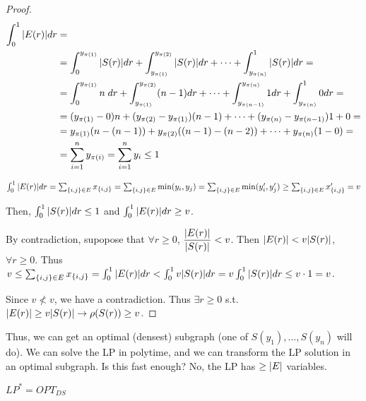 \begin{proof}
        \begin{equation*}
            \begin{split}
                \int_0^1 \vert E(r) \vert dr &=\\
                    &= \int_{0}^{y_{\pi(1)}} \vert S(r) \vert dr + \int_{y_{\pi(1)}}^{y_{\pi(2)}} \vert S(r) \vert dr + \cdots + \int_{y_{\pi(n)}}^{1} \vert S(r) \vert dr =\\
                    &= \int_{0}^{y_{\pi(1)}} n \; dr + \int_{y_{\pi(1)}}^{y_{\pi(2)}} (n-1)dr + \cdots + \int_{y_{\pi(n-1)}}^{y_{\pi(n)}} 1 dr + \int_{y_{\pi(n)}}^{1} 0 dr =\\
                    &= (y_{\pi(1)} - 0)n + (y_{\pi(2)} - y_{\pi(1)})(n-1) + \cdots + (y_{\pi(n)} - y_{\pi(n-1)})1 + 0 =\\
                    &= y_{\pi(1)} (n - (n-1)) + y_{\pi(2)}((n-1) - (n-2)) + \cdots + y_{\pi(n)}(1-0) =\\
                    &= \sum_{i=1}^{n} y_{\pi(i)} = \sum_{i=1}^{n} y_i \leq 1
            \end{split}
        \end{equation*}

        $  \int_0^1 \vert E(r) \vert dr = \sum_{\{i,j\} \in E} x_{\{i,j\}} = \sum_{\{i,j\} \in E} \min(y_i, y_j) = \sum_{\{i,j\} \in E} \min(y_i', y_j') \geq \sum_{\{i,j\} \in E} x_{\{i,j\}}' = v $

        Then, $\int_0^1 \vert S(r) \vert dr \leq 1$ and $\int_0^1 \vert E(r) \vert dr \geq v$.

        By contradiction, supopose that $\forall r \geq 0$, $\dfrac{\vert E(r) \vert}{\vert S(r) \vert} < v$.
        Then $\vert E(r) \vert < v \vert S(r) \vert$, $\forall r \geq 0$.
        Thus $v \leq \sum_{\{i,j\} \in E} x_{\{i,j\}} = \int_0^1 \vert E(r) \vert dr < \int_0^1 v \vert S(r) \vert dr = v \int_0^1 \vert S(r) \vert dr \leq v \cdot 1 = v$.

        Since $v \not< v$, we have a contradiction.
        Thus $\exists r \geq 0$ s.t. $\vert E(r) \vert \geq v \vert S(r) \vert \rightarrow \rho(S(r)) \geq v$.
    \end{proof}

    Thus, we can get an optimal (densest) subgraph (one of $S(y_1), \dots, S(y_n)$ will do).
    We can solve the LP in polytime, and we can transform the LP solution in an optimal subgraph.
    Is this fast enough? No, the LP has $\geq \vert E \vert$ variables.

    \begin{corollary}
        $LP^* = OPT_{DS}$
    \end{corollary}

